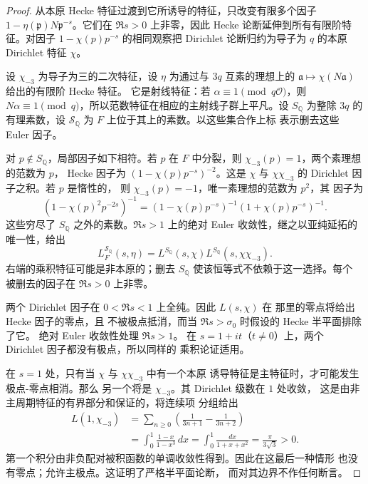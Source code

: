 \begin{proof}
从本原 Hecke 特征过渡到它所诱导的特征，只改变有限多个因子
$1-\eta(\mathfrak p)N\mathfrak p^{-s}$。它们在 $\Re s>0$ 上非零，因此 Hecke
论断延伸到所有有限阶特征。对因子
$1-\chi(p)p^{-s}$ 的相同观察把 Dirichlet 论断归约为导子为 $q$ 的本原
Dirichlet 特征 $\chi$。

设 $\chi_{-3}$ 为导子为三的二次特征，设
$\eta$ 为通过与 $3q$ 互素的理想上的
$\mathfrak a\mapsto\chi(N\mathfrak a)$ 给出的有限阶 Hecke 特征。
它是射线特征：若 $\alpha\equiv1\pmod{q\mathcal O}$，则
$N\alpha\equiv1\pmod q$，所以范数特征在相应的主射线子群上平凡。设 $S_{\mathbb Q}$ 为整除
$3q$ 的有理素数，设 $\mathcal S_{\mathbb Q}$ 为 $F$ 上位于其上的素数。以这些集合作上标
表示删去这些 Euler 因子。

对 $p\notin S_{\mathbb Q}$，局部因子如下相符。若 $p$
在 $F$ 中分裂，则 $\chi_{-3}(p)=1$，两个素理想的范数为 $p$，
Hecke 因子为 $(1-\chi(p)p^{-s})^{-2}$。这是
$\chi$ 与 $\chi\chi_{-3}$ 的 Dirichlet 因子之积。若 $p$ 是惰性的，
则 $\chi_{-3}(p)=-1$，唯一素理想的范数为 $p^2$，其
因子为
\[
 (1-\chi(p)^2p^{-2s})^{-1}
  =(1-\chi(p)p^{-s})^{-1}(1+\chi(p)p^{-s})^{-1}.
\]
这些穷尽了 $S_{\mathbb Q}$ 之外的素数。$\Re s>1$ 上的绝对 Euler
收敛性，继之以亚纯延拓的唯一性，给出
\begin{equation}
 L_F^{\mathcal S_{\mathbb Q}}(s,\eta)
 =L^{S_{\mathbb Q}}(s,\chi)
      L^{S_{\mathbb Q}}(s,\chi\chi_{-3}).
 \label{eq:hecke-dirichlet-factorization}
\end{equation}
右端的乘积特征可能是非本原的；删去
$S_{\mathbb Q}$ 使该恒等式不依赖于这一选择。每个
被删去的因子在 $\Re s>0$ 上非零。

两个 Dirichlet 因子在 $0<\Re s<1$ 上全纯。因此 $L(s,\chi)$ 在
那里的零点将给出 Hecke 因子的零点，且
不被极点抵消，而当 $\Re s>\sigma_0$ 时假设的 Hecke 半平面排除了它。
绝对 Euler 收敛性处理 $\Re s>1$。
在 $s=1+it$（$t\ne0$）上，两个 Dirichlet 因子都没有极点，所以同样的
乘积论证适用。

在 $s=1$ 处，只有当 $\chi$ 与 $\chi\chi_{-3}$ 中有一个本原
诱导特征是主特征时，才可能发生极点-零点相消。那么
另一个将是 $\chi_{-3}$。其 Dirichlet 级数在 $1$ 处收敛，
这是由非主周期特征的有界部分和保证的，将连续项
分组给出
\[
 \begin{split}
 L(1,\chi_{-3})
 &=\sum_{n\ge0}\left(\frac1{3n+1}-\frac1{3n+2}\right)\\
 &=\int_0^1\frac{1-x}{1-x^3}\,dx
   =\int_0^1\frac{dx}{1+x+x^2}
   =\frac{\pi}{3\sqrt3}>0.
 \end{split}
\]
第一个积分由非负配对被积函数的单调收敛性得到。因此在这最后一种情形
也没有零点；允许主极点。这证明了严格半平面论断，
而对其边界不作任何断言。
\end{proof}

